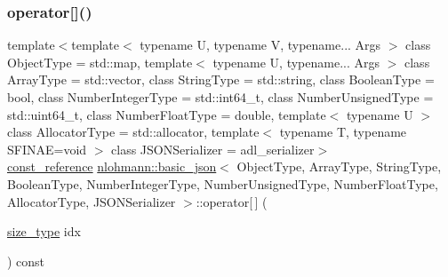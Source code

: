 \mbox{\label{classnlohmann_1_1basic__json_a9cb592cd85c14f3e845e30d51cf17efb}} 
\subsubsection{\texorpdfstring{operator[]()}{operator[]()}\hspace{0.1cm}{\footnotesize\ttfamily [2/10]}}
{\footnotesize\ttfamily template$<$template$<$ typename U, typename V, typename... Args $>$ class Object\+Type = std\+::map, template$<$ typename U, typename... Args $>$ class Array\+Type = std\+::vector, class String\+Type  = std\+::string, class Boolean\+Type  = bool, class Number\+Integer\+Type  = std\+::int64\+\_\+t, class Number\+Unsigned\+Type  = std\+::uint64\+\_\+t, class Number\+Float\+Type  = double, template$<$ typename U $>$ class Allocator\+Type = std\+::allocator, template$<$ typename T, typename S\+F\+I\+N\+A\+E=void $>$ class J\+S\+O\+N\+Serializer = adl\+\_\+serializer$>$ \\
\mbox{\hyperlink{classnlohmann_1_1basic__json_a4057c5425f4faacfe39a8046871786ca}{const\+\_\+reference}} \mbox{\hyperlink{classnlohmann_1_1basic__json}{nlohmann\+::basic\+\_\+json}}$<$ Object\+Type, Array\+Type, String\+Type, Boolean\+Type, Number\+Integer\+Type, Number\+Unsigned\+Type, Number\+Float\+Type, Allocator\+Type, J\+S\+O\+N\+Serializer $>$\+::operator\mbox{[}$\,$\mbox{]} (\begin{DoxyParamCaption}\item[{\mbox{\hyperlink{classnlohmann_1_1basic__json_a39f2cd0b58106097e0e67bf185cc519b}{size\+\_\+type}}}]{idx }\end{DoxyParamCaption}) const\hspace{0.3cm}{\ttfamily [inline]}}



